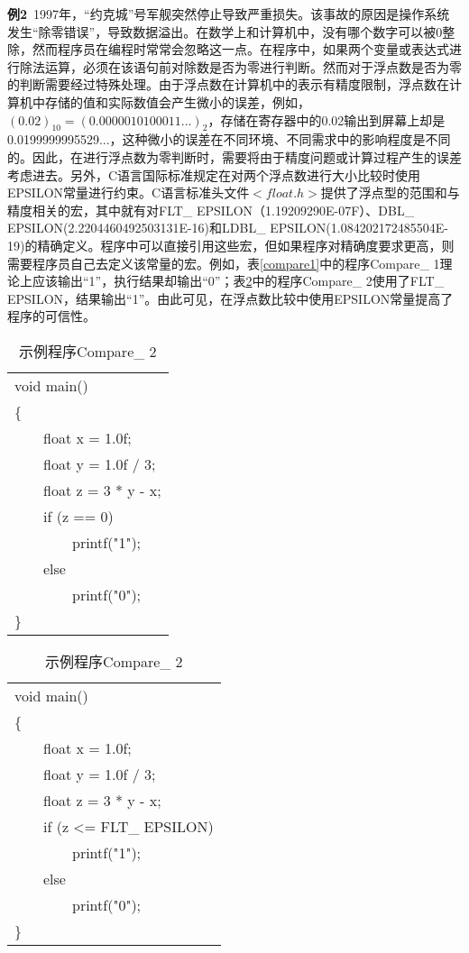 \textbf{例2}~1997年，“约克城”号军舰突然停止导致严重损失。该事故的原因是操作系统发生“除零错误”，导致数据溢出。在数学上和计算机中，没有哪个数字可以被0整除，然而程序员在编程时常常会忽略这一点。在程序中，如果两个变量或表达式进行除法运算，必须在该语句前对除数是否为零进行判断。然而对于浮点数是否为零的判断需要经过特殊处理。由于浮点数在计算机中的表示有精度限制，浮点数在计算机中存储的值和实际数值会产生微小的误差，例如，$(0.02)_{10}=(0.0000010100011...)_2$，存储在寄存器中的0.02输出到屏幕上却是0.0199999995529...，这种微小的误差在不同环境、不同需求中的影响程度是不同的。因此，在进行浮点数为零判断时，需要将由于精度问题或计算过程产生的误差考虑进去。另外，C语言国际标准\cite{informationtechnologyindustrylanguages1984}规定在对两个浮点数进行大小比较时使用EPSILON常量进行约束。C语言标准头文件$<float.h>$提供了浮点型的范围和与精度相关的宏，其中就有对FLT\_ EPSILON（1.19209290E-07F）、DBL\_ EPSILON(2.2204460492503131E-16)和LDBL\_ EPSILON(1.084202172485504E-19)的精确定义。程序中可以直接引用这些宏，但如果程序对精确度要求更高，则需要程序员自己去定义该常量的宏。例如，表\ref{compare1}中的程序Compare\_ 1理论上应该输出“1”，执行结果却输出“0”；表\ref{compare2}中的程序Compare\_ 2使用了FLT\_ EPSILON，结果输出“1”。由此可见，在浮点数比较中使用EPSILON常量提高了程序的可信性。
\begin{table}[htb]
\begin{minipage}{.5\linewidth}
\centering
\caption{示例程序Compare\_ 1}
\begin{tabular}{|l|}
\hline
void main()\\
\{\\
~~~~float x = 1.0f;\\
~~~~float y = 1.0f / 3;\\
~~~~float z = 3 * y - x;\\
~~~~if (z == 0)\\
~~~~~~~~printf("1");\\
~~~~else\\
~~~~~~~~printf("0");\\
\}\\
\hline
\end{tabular}
\label{compare1}
\end{minipage}
\begin{minipage}{.5\linewidth}
\centering
\caption{示例程序Compare\_ 2}
\begin{tabular}{|l|}
\hline
void main()\\
\{\\
~~~~float x = 1.0f;\\
~~~~float y = 1.0f / 3;\\
~~~~float z = 3 * y - x;\\
~~~~if (z <= FLT\_ EPSILON)\\
~~~~~~~~printf("1");\\
~~~~else\\
~~~~~~~~printf("0");\\
\}\\
\hline
\end{tabular}
\label{compare2}
\end{minipage}
\end{table}
